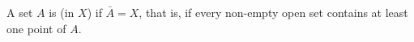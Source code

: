 A set $A$ is  (in $X$) if $\bar{A} = X$, that is, if every non-empty open set contains at least one point of $A$.
